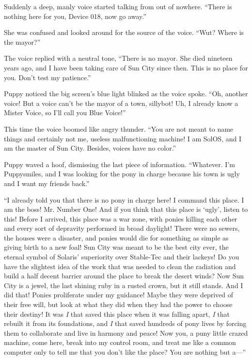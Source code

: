 Suddenly a deep, manly voice started talking from out of nowhere. ``There is nothing here for you, Device 018, now go away.''

She was confused and looked around for the source of the voice. ``Wut? Where is the mayor?''

The voice replied with a neutral tone, ``There is no mayor. She died nineteen years ago, and I have been taking care of Sun City since then. This is no place for you. Don't test my patience.''

Puppy noticed the big screen's blue light blinked as the voice spoke. ``Oh, another voice! But a voice can't be the mayor of a town, sillybot! Uh, I already know a Mister Voice, so I'll call you Blue Voice!''

This time the voice boomed like angry thunder. ``You are not meant to name things and certainly not me, useless malfunctioning machine! I am SolOS, and I am the master of Sun City. Besides, voices have no color.''

Puppy waved a hoof, dismissing the last piece of information. ``Whatever. I'm Puppysmiles, and I was looking for the pony in charge because his town is ugly and I want my friends back.''

``I already told you that there is no pony in charge here! I command this place. I am the boss! Mr. Number One! And if you think that this place is `ugly', listen to this! Before I arrived, this place was a war zone, with ponies killing each other and every sort of depravity performed in broad daylight! There were no sewers, the houses were a disaster, and ponies would die for something as simple as giving birth to a new foal! Sun City was meant to be the best city ever, the eternal symbol of Solaris' superiority over Stable-Tec and their lackeys! Do you have the slightest idea of the work that was needed to clean the radiation and build a half decent barrier around the place to break the desert winds? Now Sun City is a jewel, the last shining ruby in a rusted crown, but it still stands. And I did that! Ponies proliferate under my guidance! Maybe they were deprived of their free will, but look at what they did when they had the power to choose their destiny! It was \emph{I} that saved this place when it was falling apart, \emph{I} that rebuilt it from its foundations, and \emph{I} that saved hundreds of pony lives by forcing them to collaborate and live in harmony and peace! Now you, a puny little crazed machine, come here, break into my control room, and treat me like a common computer only to tell me that you don't like the place? You are nothing but a---''

